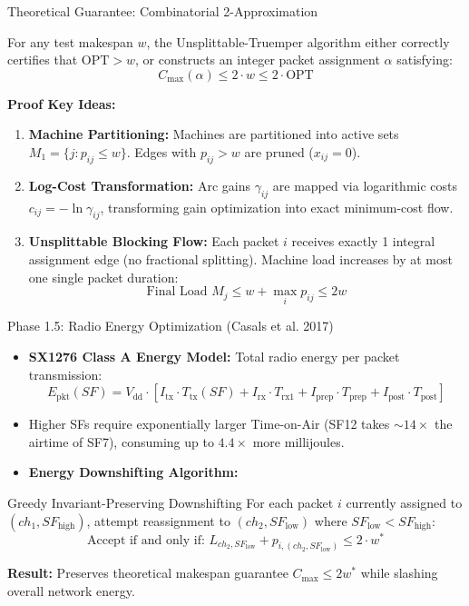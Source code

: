 \documentclass[aspectratio=169,10pt]{beamer}
\begin{document}
\begin{frame}{Theoretical Guarantee: Combinatorial 2-Approximation}
  \begin{theorem}
    For any test makespan $w$, the Unsplittable-Truemper algorithm either correctly certifies that $\text{OPT} > w$, or constructs an integer packet assignment $\alpha$ satisfying:
    $$C_{\max}(\alpha) \le 2 \cdot w \le 2 \cdot \text{OPT}$$
  \end{theorem}
  \textbf{Proof Key Ideas:}
  \begin{enumerate}
    \item \textbf{Machine Partitioning:} Machines are partitioned into active sets $M_1 = \{j : p_{ij} \le w\}$. Edges with $p_{ij} > w$ are pruned ($x_{ij} = 0$).
    \item \textbf{Log-Cost Transformation:} Arc gains $\gamma_{ij}$ are mapped via logarithmic costs $c_{ij} = -\ln \gamma_{ij}$, transforming gain optimization into exact minimum-cost flow.
    \item \textbf{Unsplittable Blocking Flow:} Each packet $i$ receives exactly 1 integral assignment edge (no fractional splitting). Machine load increases by at most one single packet duration:
    $$\text{Final Load } M_j \le w + \max_i p_{ij} \le 2 w$$
  \end{enumerate}
\end{frame}

\begin{frame}{Phase 1.5: Radio Energy Optimization (Casals et al. 2017)}
  \begin{itemize}
    \item \textbf{SX1276 Class A Energy Model:} Total radio energy per packet transmission:
    $$E_{\text{pkt}}(SF) = V_{\text{dd}} \cdot \left[ I_{\text{tx}} \cdot T_{\text{tx}}(SF) + I_{\text{rx}} \cdot T_{\text{rx1}} + I_{\text{prep}} \cdot T_{\text{prep}} + I_{\text{post}} \cdot T_{\text{post}} \right]$$
    \item Higher SFs require exponentially larger Time-on-Air (SF12 takes $\sim 14\times$ the airtime of SF7), consuming up to $4.4\times$ more millijoules.
    \item \textbf{Energy Downshifting Algorithm:}
  \end{itemize}
  \begin{block}{Greedy Invariant-Preserving Downshifting}
    For each packet $i$ currently assigned to $(ch_1, SF_{\text{high}})$, attempt reassignment to $(ch_2, SF_{\text{low}})$ where $SF_{\text{low}} < SF_{\text{high}}$:
    $$\text{Accept if and only if: } L_{ch_2, SF_{\text{low}}} + p_{i, (ch_2, SF_{\text{low}})} \le 2 \cdot w^*$$
  \end{block}
  \textbf{Result:} Preserves theoretical makespan guarantee $C_{\max} \le 2 w^*$ while slashing overall network energy.
\end{frame}
\end{document}
